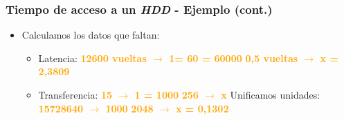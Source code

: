 \begin{frame}
  \frametitle{Tiempo de acceso a un \textit{HDD} - Ejemplo (cont.)}
  \begin{itemize}    
    \item Calculamos los datos que faltan:
    \begin{itemize}
      \item Latencia:
      \linebreak
      \textcolor{orange}{\textbf{12600 vueltas $\rightarrow$ 1\msymbol = 60 \s = 60000 \ms}}
      \linebreak
      \textcolor{orange}{\textbf{0,5 vueltas $\rightarrow$ x = 2,3809 \ms}}
      \linebreak
      \item Transferencia:
      \linebreak
      \textcolor{orange}{\textbf{15 \mebishort\bits \hspace{1pt} $\rightarrow$ 1 \s = 1000 \ms}}
      \linebreak
      \textcolor{orange}{\textbf{256 \bytes \hspace{1pt} $\rightarrow$ x}}
      \linebreak
      \linebreak
      Unificamos unidades:
      \linebreak
      \textcolor{orange}{\textbf{15728640 \bits \hspace{1pt} $\rightarrow$ 1000 \ms}}
      \linebreak
      \textcolor{orange}{\textbf{2048 \bits \hspace{1pt} $\rightarrow$ x = 0,1302 \ms}}
    \end{itemize}
  \end{itemize}
\end{frame}

